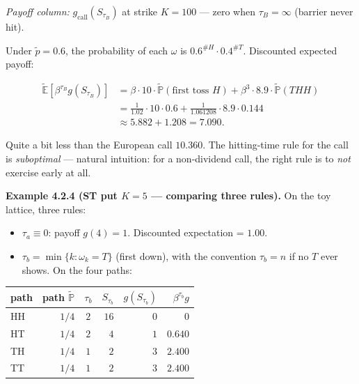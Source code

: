 \documentclass[
  10pt,
  twoside]{book}
\newcounter{none} %
\providecommand{\tightlist}{%
  \setlength{\itemsep}{0pt}\setlength{\parskip}{0pt}}
\begin{document}
\emph{Payoff column:} \(g_{\text{call}}(S_{\tau_B})\) at strike
\(K = 100\) --- zero when \(\tau_B = \infty\) (barrier never hit).

Under \(\tilde p = 0.6\), the probability of each \(\omega\) is
\(0.6^{\#H}\cdot 0.4^{\#T}\). Discounted expected payoff:

\[\begin{aligned}
\tilde{\mathbb{E}}[\beta^{\tau_B} g(S_{\tau_B})] &= \beta\cdot 10\cdot \tilde{\mathbb{P}}(\text{first toss }H) + \beta^3 \cdot 8.9 \cdot \tilde{\mathbb{P}}(THH) \\
&= \tfrac{1}{1.02}\!\cdot 10\!\cdot 0.6 + \tfrac{1}{1.061208}\!\cdot 8.9\!\cdot 0.144 \\
&\approx 5.882 + 1.208 = 7.090.
\end{aligned}\]

Quite a bit less than the European call \(10.360\). The hitting-time
rule for the call is \emph{suboptimal} --- natural intuition: for a
non-dividend call, the right rule is to \emph{not} exercise early at
all.

\textbf{Example 4.2.4 (ST put \(K=5\) --- comparing three rules).} On
the toy lattice, three rules:

\begin{itemize}
\tightlist
\item
  \(\tau_a \equiv 0\): payoff \(g(4) = 1\). Discounted expectation =
  \(1.00\).
\item
  \(\tau_b = \min\{k : \omega_k = T\}\) (first down), with the
  convention \(\tau_b = n\) if no \(T\) ever shows. On the four paths:
\end{itemize}

{\def\LTcaptype{none} %
\begin{table}[H]
\centering
\begin{tabular}{|l|r|c|r|r|r|}
\toprule
path & path \(\tilde{\mathbb{P}}\) & \(\tau_b\) & \(S_{\tau_b}\) & \(g(S_{\tau_b})\) & \(\beta^{\tau_b} g\) \\
\midrule



HH & \(1/4\) & \(2\) & \(16\) & \(0\) & \(0\) \\
HT & \(1/4\) & \(2\) & \(4\) & \(1\) & \(0.640\) \\
TH & \(1/4\) & \(1\) & \(2\) & \(3\) & \(2.400\) \\
TT & \(1/4\) & \(1\) & \(2\) & \(3\) & \(2.400\) \\
\bottomrule
\end{tabular}
\end{table}
}
\end{document}
